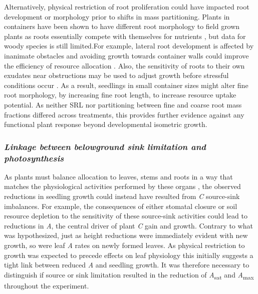 \documentclass[a4paper]{article}\usepackage[]{graphicx}\usepackage[]{color}
\begin{document}
Alternatively, physical restriction of root proliferation could have impacted root development or morphology prior to shifts in mass partitioning. Plants in containers have been shown to have different root morphology to field grown plants as roots essentially compete with themselves for nutrients \citep{nesmith1998effect}, but data for woody species is still limited.For example, lateral root development is affected by inanimate obstacles and avoiding growth towards container walls could improve the efficiency of resource allocation \citep{falik2005root}. Also, the sensitivity of roots to their own exudates near obstructions may be used to adjust growth before stressful conditions occur \citep{semchenko2008foraging}. As a result, seedlings in small container sizes might alter fine root morphology, by increasing fine root length, to increase resource uptake potential. 
As neither SRL nor partitioning between fine and coarse root mass fractions differed across treatments, this provides further evidence against any functional plant response beyond developmental isometric growth.

\subsubsection*{\textit{Linkage between belowground sink limitation and photosynthesis}}

As plants must balance allocation to leaves, stems and roots in a way that matches the physiological activities performed by these organs \citep{poorter2012biomass}, the observed reductions in seedling growth could instead have resulted from \textit{C} source-sink imbalances. For example, the consequences of either stomatal closure or soil resource depletion to the sensitivity of these source-sink activities could lead to reductions in \textit{A}, the central driver of plant \textit{C} gain and growth. Contrary to what was hypothesized, just as height reductions were immediately evident with new growth, so were leaf \textit{A} rates on newly formed leaves. As physical restriction to growth was expected to precede effects on leaf physiology this initially suggests a tight link between reduced \textit{A} and seedling growth. It was therefore necessary to distinguish if source or sink limitation resulted in the reduction of \textit{A}\textsubscript{sat} and \textit{A}\textsubscript{max}  throughout the experiment.
\end{document}
